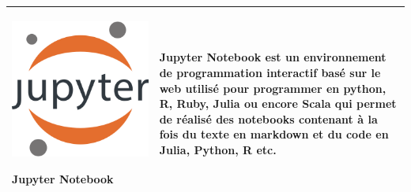 \begin{table}[H]
\begin{tabular}{|m{5cm}|m{14cm}|}
  \begin{center}
    \begin{minipage}{.3\textwidth}
    \includegraphics[width=\textwidth]{images/chapitre7/jupyter.png}
  \end{minipage}
  \end{center}
  \centering \textbf{Jupyter Notebook} \cite{Kluyver2016jupyter} & Jupyter Notebook est un environnement de programmation interactif basé sur le web utilisé pour programmer en python, R, Ruby, Julia ou encore Scala qui permet de réalisé des notebooks contenant à la fois du texte en markdown et du code en Julia, Python, R etc.  \\ \hline


\end{tabular}
\end{table}
